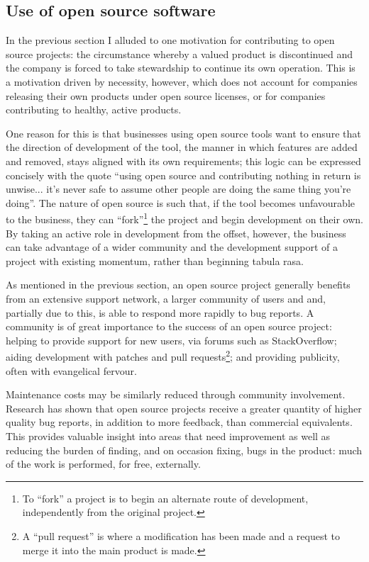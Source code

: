 \documentclass[a4paper]{article}
\begin{document}
\subsection{Use of open source software}

In the previous section I alluded to one motivation for contributing to open source projects: the circumstance whereby a valued product is discontinued and the company is forced to take stewardship to continue its own operation. This is a motivation driven by necessity, however, which does not account for companies releasing their own products under open source licenses, or for companies contributing to healthy, active products.

One reason for this is that businesses using open source tools want to ensure that the direction of development of the tool, the manner in which features are added and removed, stays aligned with its own requirements; this logic can be expressed concisely with the quote “using open source and contributing nothing in return is unwise... it’s never safe to assume other people are doing the same thing you’re doing”\cite{feedfish}. The nature of open source is such that, if the tool becomes unfavourable to the business, they can “fork”\footnote{To “fork” a project is to begin an alternate route of development, independently from the original project.} the project and begin development on their own. By taking an active role in development from the offset, however, the business can take advantage of a wider community and the development support of a project with existing momentum, rather than beginning tabula rasa.

As mentioned in the previous section, an open source project generally benefits from an extensive support network, a larger community of users and and, partially due to this, is able to respond more rapidly to bug reports. A community is of great importance to the success of an open source project: helping to provide support for new users, via forums such as StackOverflow\cite{stackoverflow}; aiding development with patches and pull requests\footnote{A “pull request” is where a modification has been made and a request to merge it into the main product is made.}; and providing publicity, often with evangelical fervour\cite{whyemacs}. 

Maintenance costs may be similarly reduced through community involvement. Research has shown that open source projects receive a greater quantity of higher quality bug reports, in addition to more feedback, than commercial equivalents\cite{cio}. This provides valuable insight into areas that need improvement as well as reducing the burden of finding, and on occasion fixing, bugs in the product: much of the work is performed, for free, externally.
\end{document}
